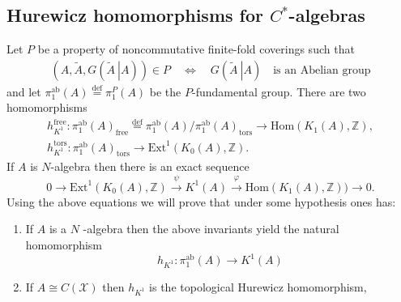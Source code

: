 \documentclass{beamer}
\theoremstyle{plain}
\newcommand{\be}{\begin{equation}}
\newcommand{\ee}{\end{equation}}
\newcommand{\Z}{\mathbb{Z}}                  %
\newcommand{\Hom}{\mathrm{Hom}}
\newcommand{\sX}{\mathcal{X}}       %
\newcommand{\Ext}{\mathrm{Ext}}       %
\newcommand{\bean}{\begin{eqnarray*}}
\newcommand{\eean}{\end{eqnarray*}}
\newcommand{\bydef}{\stackrel{\mathrm{def}}{=}}
\begin{document}
\begin{frame}
\section{Hurewicz homomorphisms for $C^*$-algebras}
Let $P$ be a property of noncommutative finite-fold coverings such that
\bean
\left(A, \widetilde{A}, G\left(\left.\widetilde{A}~\right| A\right)\right)\in P \quad \Leftrightarrow \quad G\left(\left.\widetilde{A}~\right| A\right) \quad \text{is an Abelian group}
\eean
and let $\pi^{\text{ab}}_1\left(A \right)\bydef \pi^{P}_1\left(A \right)$ be the $P$-{fundamental group}. 
There are two homomorphisms
\bean
	h^{\mathrm{free}}_{K^1} : \pi^{\text{ab}}_1\left(A \right)_{\mathrm{free}}\bydef \pi^{\text{ab}}_1\left(A \right)/\pi^{\text{ab}}_1\left(A \right)_{\mathrm{tors}} \to  \Hom\left(  K_1\left( A\right), \Z\right),\\
	h_{K^1}^{\mathrm{tors}} : \pi_1^{\text{ab}}\left(A \right)_{\mathrm{tors}}\to   \mathrm{\Ext}^1\left( K_0(A), \mathbb{Z}\right).
\eean
If $A$ is $N$-algebra then there is an exact sequence 
\begin{equation}\nonumber
	0\to	\mathrm{\Ext}^1\left( K_0(A), \mathbb{Z}\right)  \xrightarrow{\psi} K^1(A) \xrightarrow{\varphi} \mathrm{Hom}(K_1(A), \mathbb{Z}))\to 0.
\end{equation}
Using the above equations we will prove that under some hypothesis ones has:
\begin{enumerate}
	\item If $A$ is a $N$ -algebra then the above invariants  yield the natural homomorphism
	\be\nonumber
	h_{K^1}: \pi^{\text{ab}}_1\left(A \right) \to K^1\left( A\right) 
	\ee
	\item If $A \cong C\left( \sX\right)$ then $	h_{K^1}$ is the topological  Hurewicz homomorphism,
\end{enumerate}
	\end{frame}
\end{document}
